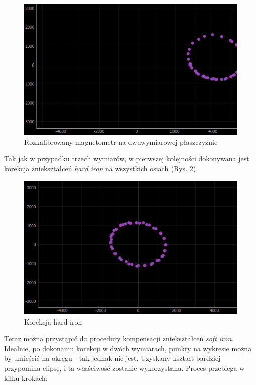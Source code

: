 \begin{figure}[H]
	\centering
		\includegraphics[width=0.8\linewidth]{rys/ScanBot-08-2d-calibration-theta-sigma.PNG}
	\caption{Rozkalibrowany magnetometr na dwuwymiarowej płaszczyźnie}
	\label{fig:2d-mag-no-cal}
\end{figure}

Tak jak w przypadku trzech wymiarów, w pierwszej kolejności dokonywana jest korekcja zniekształceń \emph{hard iron} na wszystkich osiach (Rys. \ref{fig:2d-mag-hard-corr-xy}).

\begin{figure}[H]
	\centering
		\includegraphics[width=0.8\linewidth]{rys/ScanBot-10-2d-calibration-theta-sigma-2-added-hard-offset-reset-data-so-soft-iron-values-are-proper.PNG}
	\caption{Korekcja hard iron}
	\label{fig:2d-mag-hard-corr-xy}
\end{figure}


Teraz można przystąpić do procedury kompensacji zniekształceń \emph{soft iron}. Idealnie, po dokonaniu korekcji w dwóch wymiarach, punkty na wykresie można by umieścić na okręgu - tak jednak nie jest. Uzyskany kształt bardziej przypomina elipsę, i ta właściwość zostanie wykorzystana. Proces przebiega w kilku krokach:

